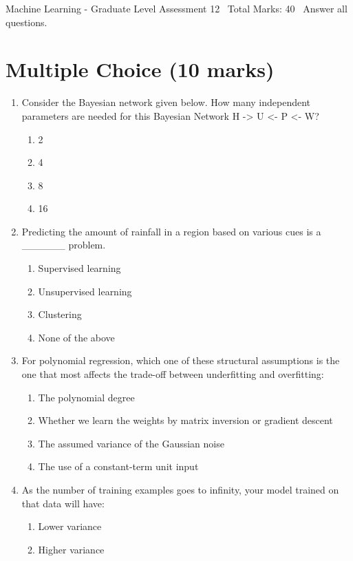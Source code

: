 \documentclass[12pt]{article}
\begin{document}
\begin{center}
Machine Learning - Graduate Level Assessment 12 \
Total Marks: 40 \
Answer all questions.
\end{center}

\section*{Multiple Choice (10 marks)}
\begin{enumerate}[label=\arabic*.]
\item Consider the Bayesian network given below. How many independent parameters are needed for this Bayesian Network H -\textgreater{} U \textless{}- P \textless{}- W?
\begin{enumerate}[label=(\alph*)]
    \item 2
    \item 4
    \item 8
    \item 16
\end{enumerate}
\item Predicting the amount of rainfall in a region based on various cues is a \_\_\_\_\_\_ problem.
\begin{enumerate}[label=(\alph*)]
    \item Supervised learning
    \item Unsupervised learning
    \item Clustering
    \item None of the above
\end{enumerate}
\item For polynomial regression, which one of these structural assumptions is the one that most affects the trade-off between underfitting and overfitting:
\begin{enumerate}[label=(\alph*)]
    \item The polynomial degree
    \item Whether we learn the weights by matrix inversion or gradient descent
    \item The assumed variance of the Gaussian noise
    \item The use of a constant-term unit input
\end{enumerate}
\item As the number of training examples goes to infinity, your model trained on that data will have:
\begin{enumerate}[label=(\alph*)]
    \item Lower variance
    \item Higher variance

\end{enumerate}
\end{enumerate}
\end{document}
